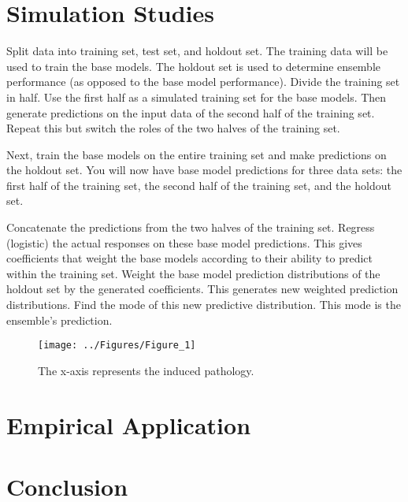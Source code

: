 \documentclass[12pt,titlepage]{mktg-article}
\begin{document}
\hypertarget{simulation-studies}{%
\section{Simulation Studies}\label{simulation-studies}}

Split data into training set, test set, and holdout set. The training data will be used to train the base models. The holdout set is used to determine ensemble performance (as opposed to the base model performance). Divide the training set in half. Use the first half as a simulated training set for the base models. Then generate predictions on the input data of the second half of the training set. Repeat this but switch the roles of the two halves of the training set.

Next, train the base models on the entire training set and make predictions on the holdout set. You will now have base model predictions for three data sets: the first half of the training set, the second half of the training set, and the holdout set.

Concatenate the predictions from the two halves of the training set. Regress (logistic) the actual responses on these base model predictions. This gives coefficients that weight the base models according to their ability to predict within the training set. Weight the base model prediction distributions of the holdout set by the generated coefficients. This generates new weighted prediction distributions. Find the mode of this new predictive distribution. This mode is the ensemble's prediction.

\begin{figure}

{\centering \texttt{[image: ../Figures/Figure\_1]} 

}

\caption{The x-axis represents the induced pathology.}\label{fig:ensemble-relative}
\end{figure}

\hypertarget{empirical-application}{%
\section{Empirical Application}\label{empirical-application}}

\hypertarget{conclusion}{%
\section{Conclusion}\label{conclusion}}
\end{document}
